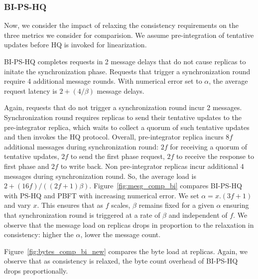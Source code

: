 \documentclass[twocolumn,10pt]{article}
\newcommand{\stitle}[1]{\vspace{2pt}{\bf #1:}}
\begin{document}
\subsubsection{BI-PS-HQ}
Now, we consider the impact of relaxing the consistency requirements on the three metrics we
consider for comparision. We assume pre-integration of tentative updates before HQ is invoked
for linearization.

\stitle{Response latency} BI-PS-HQ completes requests in 2 message delays that do not cause replicas
to initate the synchronization phase. Requests that trigger a synchronization round require
4 additional message rounds. With numerical error set to $\alpha$, the average request
latency is $2+(4/\beta)$ message delays.

\stitle{Message load} Again, requests that do not trigger a synchronization round incur 2 messages.
Synchronization round requires replicas to send their tentative updates to
the pre-integrator replica, which waits to collect a quorum of such tentative updates and then 
invokes the HQ protocol. Overall, pre-integrator replica
incurs $8f$ additional messages during synchronization round: $2f$ for receiving a quorum of 
tentative updates, $2f$ to send the first phase
request, $2f$ to receive the response to first phase and $2f$ to write back. Non pre-integrator
replicas incur additional 4 messages during synchronization round. 
So, the average load is $2+(16f)/((2f+1)\beta)$. 
Figure~\ref{fig:mesg_comp_bi} compares BI-PS-HQ with PS-HQ and PBFT with increasing numerical error.
We set $\alpha= x.(3f+1)$ and vary $x$. This ensures that as $f$ scales, $\beta$ remains fixed
for a given $\alpha$ ensuring that synchronization round is triggered at a rate of $\beta$ and 
independent of $f$. We observe that the message
load on replicas drops in proportion to the relaxation in consistency: higher the $\alpha$, lower
the message count.  


\stitle{Byte load} 
Figure~\ref{fig:bytes_comp_bi_new} compares the byte load at replicas. 
Again, we observe that as consistency is relaxed, the byte count overhead of BI-PS-HQ 
drops proportionally. 
\end{document}
